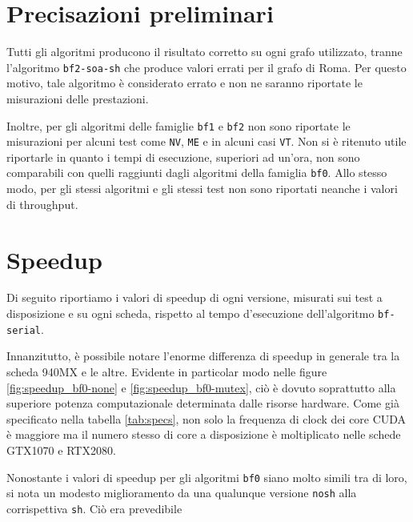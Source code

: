 \documentclass[12pt,a4paper]{book}
\begin{document}
	\section{Precisazioni preliminari}
	Tutti gli algoritmi producono il risultato corretto su ogni grafo utilizzato, tranne l'algoritmo \texttt{bf2-soa-sh} che produce valori errati per il grafo di Roma. Per questo motivo, tale algoritmo è considerato errato e non ne saranno riportate le misurazioni delle prestazioni.
	
	Inoltre, per gli algoritmi delle famiglie \texttt{bf1} e \texttt{bf2} non sono riportate le misurazioni per alcuni test come \texttt{NV}, \texttt{ME} e in alcuni casi \texttt{VT}. Non si è ritenuto utile riportarle in quanto i tempi di esecuzione, superiori ad un'ora, non sono comparabili con quelli raggiunti dagli algoritmi della famiglia \texttt{bf0}. Allo stesso modo, per gli stessi algoritmi e gli stessi test non sono riportati neanche i valori di throughput.
	
	\section{Speedup}
	Di seguito riportiamo i valori di speedup di ogni versione, misurati sui test a disposizione e su ogni scheda, rispetto al tempo d'esecuzione dell'algoritmo \texttt{bf-serial}.
	
	Innanzitutto, è possibile notare l'enorme differenza di speedup in generale tra la scheda 940MX e le altre. Evidente in particolar modo nelle figure \ref{fig:speedup_bf0-none} e \ref{fig:speedup_bf0-mutex}, ciò è dovuto soprattutto alla superiore potenza computazionale determinata dalle risorse hardware. Come già specificato nella tabella \ref{tab:specs}, non solo la frequenza di clock dei core CUDA è maggiore ma il numero stesso di core a disposizione è moltiplicato nelle schede GTX1070 e RTX2080.
	
	Nonostante i valori di speedup per gli algoritmi \texttt{bf0} siano molto simili tra di loro, si nota un modesto miglioramento da una qualunque versione \texttt{nosh} alla corrispettiva \texttt{sh}. Ciò era prevedibile 
	
\end{document}
